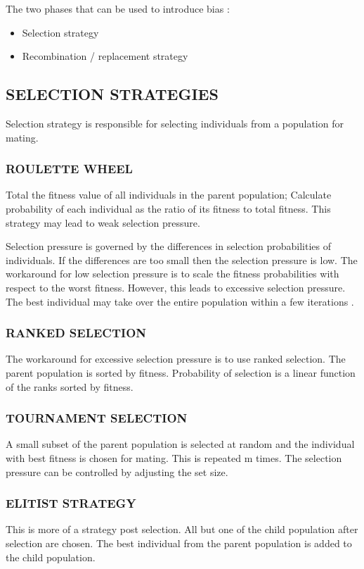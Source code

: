 \documentclass[12pt,a4paper]{article}
\begin{document}
	The two phases that can be used to introduce bias \cite{handbook}: 
	\begin{itemize}
	\item Selection strategy
	\item Recombination / replacement strategy
	\end{itemize}
	
	\subsection{SELECTION STRATEGIES} 
	Selection strategy is responsible for selecting individuals from a population for mating.
	\subsubsection{ROULETTE WHEEL}
	Total the fitness value of all individuals in the parent population; Calculate probability of each individual as the ratio of its fitness to total fitness. This strategy may lead to weak selection pressure. \par
	Selection pressure is governed by the differences in selection probabilities of individuals. If the differences are too small then the selection pressure is low.
	The workaround for low selection pressure is to scale the fitness probabilities with respect to the worst fitness. However, this leads to excessive selection pressure. The best individual may take over the entire population within a few iterations \cite{handbook}. \par
	
	\subsubsection{RANKED SELECTION}
	The workaround for excessive selection pressure is to use ranked selection. The parent population is sorted by fitness. Probability of selection is a linear function of the ranks sorted by fitness.
	
	\subsubsection{TOURNAMENT SELECTION}
	A small subset of the parent population is selected at random and the individual with best fitness is chosen for mating. This is repeated m times. The selection pressure can be controlled by adjusting the set size.
	
	\subsubsection{ELITIST STRATEGY}
	This is more of a strategy post selection. All but one of the child population after selection are chosen. The best individual from the parent population is added to the child population.
	
\end{document}
